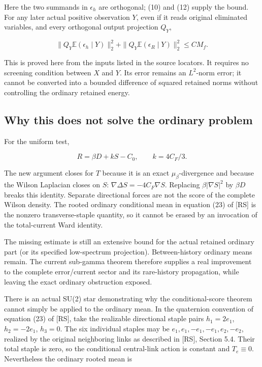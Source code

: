 \documentclass[
  11pt,
]{article}
\begin{document}
Here the two summands in \(\epsilon_h\) are orthogonal; (10) and (12)
supply the bound. For any later actual positive observation \(Y\), even
if it reads original eliminated variables, and every orthogonal output
projection \(Q_Y\),

\[
 \|Q_Y\mathbb E(\epsilon_h\mid Y)\|_2^2+
 \|Q_Y\mathbb E(\epsilon_R\mid Y)\|_2^2\le C M_f. \tag{14}
\]

This is proved here from the inputs listed in the source locators. It requires no screening condition between \(X\) and \(Y\).
Its error remains an \(L^2\)-norm error; it cannot be converted into a
bounded difference of squared retained norms without controlling the
ordinary retained energy.

\hypertarget{why-this-does-not-solve-the-ordinary-problem}{%
\subsection{Why this does not solve the ordinary
problem}\label{why-this-does-not-solve-the-ordinary-problem}}

For the uniform test,

\[
 R=\beta D+kS-C_0,\qquad k=4C_F/3.
\]

The new argument closes for \(T\) because it is an exact
\(\mu_\beta\)-divergence and because the Wilson Laplacian closes on
\(S\): \(\nabla\Delta S=-4C_F\nabla S\). Replacing \(\beta|\nabla S|^2\)
by \(\beta D\) breaks this identity. Separate directional forces are not
the score of the complete Wilson density. The rooted ordinary
conditional mean in equation (23) of [RS] is the nonzero transverse-staple
quantity, so it cannot be erased by an invocation of the total-current
Ward identity.

The missing estimate is still an extensive bound for the actual retained
ordinary part (or its specified low-spectrum projection).
Between-history ordinary means remain. The current sub-gamma theorem
therefore supplies a real improvement to the complete error/current
sector and its rare-history propagation, while leaving the exact
ordinary obstruction exposed.

There is an actual SU(2) star demonstrating why the conditional-score
theorem cannot simply be applied to the ordinary mean. In the quaternion
convention of equation (23) of [RS], take the realizable directional
staple pairs \(h_1=2e_1\), \(h_2=-2e_1\), \(h_3=0\). The six individual
staples may be \(e_1,e_1,-e_1,-e_1,e_2,-e_2\), realized by the original
neighboring links as described in [RS], Section 5.4. Their total staple
is zero, so the conditional central-link action is constant and
\(T_e\equiv0\). Nevertheless the ordinary rooted mean is
\end{document}

